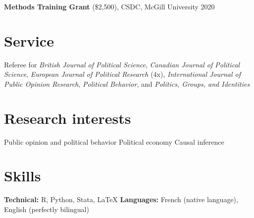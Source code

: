 \documentclass[margin, 10pt]{res}
\begin{document}
\begin{resume}
\textbf{Methods Training Grant} (\$2,500), CSDC, McGill University \hspace*{0pt}\hfill 2020

\section{Service}

Referee for \textit{British Journal of Political Science}, \textit{Canadian Journal of Political Science}, \textit{European Journal of Political Research} (4x), \textit{International Journal of Public Opinion Research}, \textit{Political Behavior}, and \textit{Politics, Groups, and Identities}

\section{Research \newline interests}
Public opinion and political behavior
\newline Political economy
\newline Causal inference

\section{Skills}

\textbf{Technical:} R, Python, Stata, \LaTeX
\newline
\null \textbf{Languages:} French (native language), English (perfectly bilingual)

\end{resume}
\end{document}
